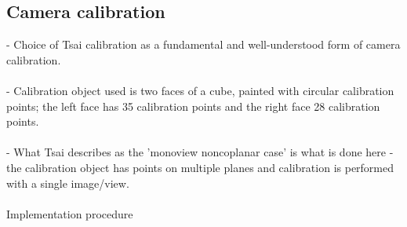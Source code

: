 \subsection{Camera calibration}

- Choice of Tsai calibration as a fundamental and well-understood form of camera calibration.\\\\
- Calibration object used is two faces of a cube, painted with circular calibration points; the left face has 35 calibration points and the right face 28 calibration points.\\\\
- What Tsai describes as the 'monoview noncoplanar case' is what is done here - the calibration object has points on multiple planes and calibration is performed with a single image/view.\\\\
Implementation procedure
